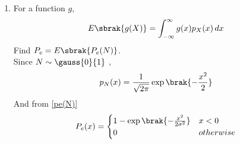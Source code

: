 \begin{enumerate}[label=\thesection.\arabic*.,ref=\thesection.\theenumi]
%
\item
%
\label{ch4_anal}
For a function $g$,
\begin{equation}
E\sbrak{g(X)} = \int_{-\infty}^{\infty}g(x)p_{X}(x)\, dx
\end{equation}
%
Find $P_e = E\sbrak{P_e(N)}$.
\\
\solution
Since $N \sim \gauss{0}{1}$ ,
\begin{align}
  p_N(x)= \frac{1}{\sqrt{2\pi}}\exp \brak{-\frac{x^2}{2} }\\
\end{align}
And from \eqref{pe(N)} 
\begin{align}
    P_e(x)=
    \begin{cases}
1-\exp\brak{{-\frac{x^2}{2\sigma^2}}} & x<0\\
0 & otherwise
\end{cases}
\end{align}


\end{enumerate}
